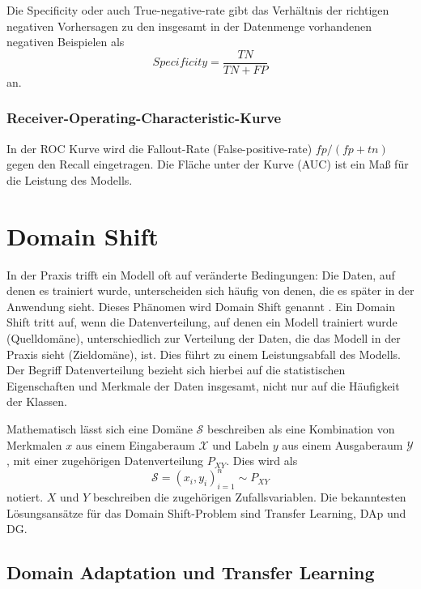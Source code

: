Die Specificity oder auch True-negative-rate gibt das Verhältnis der richtigen negativen Vorhersagen zu den insgesamt in der Datenmenge vorhandenen negativen Beispielen als
\begin{equation}
\label{eq:specificity}
Specificity = \frac{TN}{TN+FP}
\end{equation}
an.

\subsubsection*{Receiver-Operating-Characteristic-Kurve}

In der \gls{ROC} Kurve wird die Fallout-Rate (False-positive-rate) $fp/(fp+tn)$ gegen den Recall eingetragen. Die Fläche unter der Kurve (\gls{AUC}) ist ein Maß für die Leistung des Modells. \cite{burkov_machine_2019}

\section{Domain Shift}\label{sec:shift}

In der Praxis trifft ein Modell oft auf veränderte Bedingungen: Die Daten, auf denen es trainiert wurde, unterscheiden sich häufig von denen, die es später in der Anwendung sieht. Dieses Phänomen wird Domain Shift genannt \cite{dissanayake_domain_2021}. Ein Domain Shift tritt auf, wenn die Datenverteilung, auf denen ein Modell trainiert wurde (Quelldomäne), unterschiedlich zur Verteilung der Daten, die das Modell in der Praxis sieht (Zieldomäne), ist. Dies führt zu einem Leistungsabfall des Modells. Der Begriff Datenverteilung bezieht sich hierbei auf die statistischen Eigenschaften und Merkmale der Daten insgesamt, nicht nur auf die Häufigkeit der Klassen. \cite{wang_generalizing_2023}

Mathematisch lässt sich eine Domäne $\mathcal{S}$ beschreiben als eine Kombination von Merkmalen $x$ aus einem Eingaberaum $\mathcal{X}$ und Labeln $y$ aus einem Ausgaberaum $\mathcal{Y}$, mit einer zugehörigen Datenverteilung $P_{XY}$. Dies wird als 
\begin{equation}
\mathcal{S} = {(x_i,y_i)^n_{i=1}} \sim P_{XY}
\end{equation}
notiert. $X$ und $Y$ beschreiben die zugehörigen Zufallsvariablen. Die bekanntesten Lösungsansätze für das Domain Shift-Problem sind Transfer Learning, \gls{DAp} und \gls{DG}. \cite{wang_generalizing_2023}

\subsection{Domain Adaptation und Transfer Learning}

